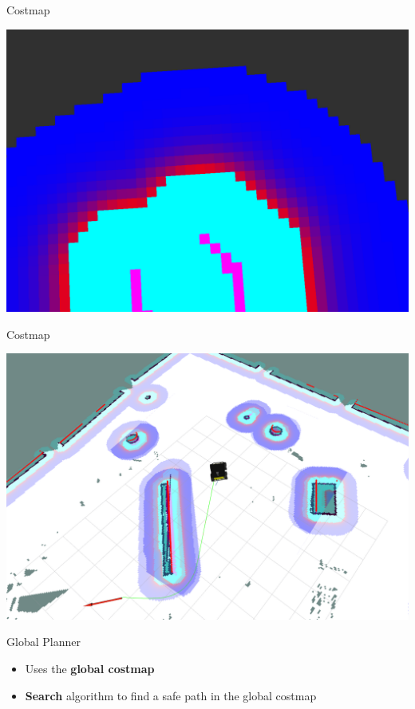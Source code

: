 \documentclass{beamer}
\begin{document}
\begin{frame}{Costmap} 
	\subtitle{Navigation Stack}
	\centering
	\includegraphics[width=.7\linewidth]{figures/costmap_4.png}
\end{frame}

\begin{frame}{Costmap} 
	\subtitle{Navigation Stack}
	\centering
	\includegraphics[width=.99\linewidth]{figures/costmap_5.png}
\end{frame}

\begin{frame}{Global Planner}
	\subtitle{Navigation Stack} 
	\begin{itemize}
		\item Uses the \textbf{global costmap}
		\vspace{0.5cm}
		\item \textbf{Search} algorithm to find a safe path in the global costmap
		\vspace{0.5cm}	
	\end{itemize}
\end{frame}
\end{document}
